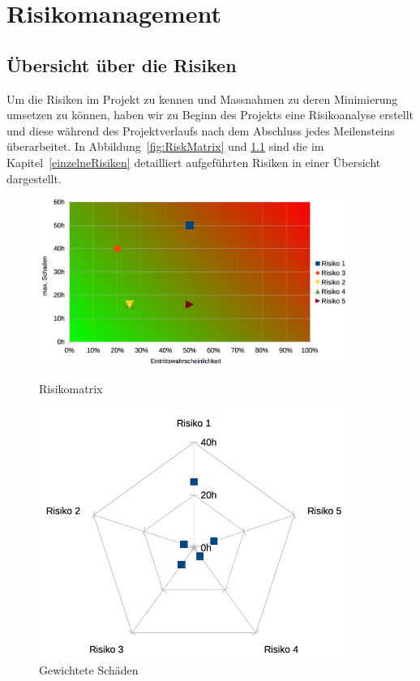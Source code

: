 \chapter{Risikomanagement}
	\label{risiken}
	
	\section{Übersicht über die Risiken}
		Um die Risiken im Projekt zu kennen und Massnahmen zu deren Minimierung umsetzen zu können, haben wir zu Beginn des Projekts eine Risikoanalyse erstellt und diese während des Projektverlaufs nach dem Abschluss jedes Meilensteins überarbeitet.
		In Abbildung~\ref{fig:RiskMatrix} und \ref{fig:RiskMatrixWeightedDamage} sind die im Kapitel~\ref{einzelneRisiken} detailliert aufgeführten Risiken in einer Übersicht dargestellt.
		
		\begin{figure}[H]
			\begin{minipage}[b]{\largeThird\linewidth}
				\includegraphics[width=0.9\textwidth]{media/spreadsheets/Risikomatrix.png}
				\centering
				\caption{Risikomatrix}
				\label{fig:RiskMatrix}
			\end{minipage}
			\begin{minipage}[b]{\smallThird\linewidth}
				\includegraphics[width=0.9\textwidth]{media/spreadsheets/RisikomatrixGewichteterSchaden.png}
				\centering
				\caption{Gewichtete Schäden}
				\label{fig:RiskMatrixWeightedDamage}
			\end{minipage}
		\end{figure}
	
